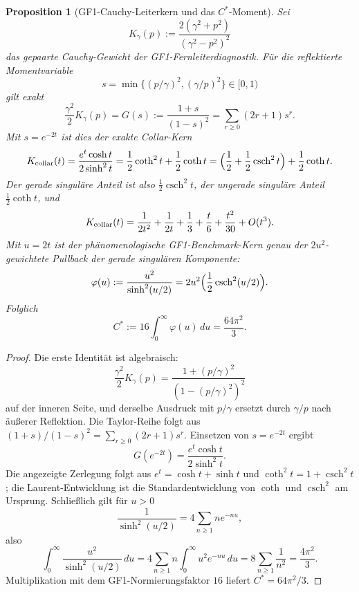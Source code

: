 \documentclass[11pt,a4paper]{article}
\newtheorem{proposition}[proposition]{Proposition}
\theoremstyle{remark}
\theoremstyle{plain}
\begin{document}
\begin{proposition}[GF1-Cauchy-Leiterkern und das \(C^*\)-Moment]
\label{prop:gf1-collar-kernel-cstar}
Sei
\[
  K_\gamma(p):=\frac{2(\gamma^2+p^2)}{(\gamma^2-p^2)^2}
\]
das gepaarte Cauchy-Gewicht der GF1-Fernleiterdiagnostik. Für die
reflektierte Momentvariable
\[
  s=\min\{(p/\gamma)^2,(\gamma/p)^2\}\in[0,1)
\]
gilt exakt
\[
  \frac{\gamma^2}{2}K_\gamma(p)
  =G(s):=\frac{1+s}{(1-s)^2}
  =\sum_{r\ge0}(2r+1)s^r.
\]
Mit \(s=e^{-2t}\) ist dies der exakte Collar-Kern
\[
  K_{\rm collar}(t)
  =\frac{e^t\cosh t}{2\sinh^2t}
  =\frac12\coth^2t+\frac12\coth t
  =\Bigl(\frac12+\frac12\operatorname{csch}^2t\Bigr)
    +\frac12\coth t .
\]
Der gerade singuläre Anteil ist also
\(\frac12\operatorname{csch}^2t\), der ungerade singuläre Anteil
\(\frac12\coth t\), und
\[
  K_{\rm collar}(t)
  =\frac{1}{2t^2}+\frac{1}{2t}+\frac13+\frac{t}{6}
    +\frac{t^2}{30}+O(t^3).
\]
Mit \(u=2t\) ist der phänomenologische GF1-Benchmark-Kern genau der
\(2u^2\)-gewichtete Pullback der gerade singulären Komponente:
\[
  \varphi(u):=\frac{u^2}{\sinh^2(u/2)}
  =2u^2\Bigl(\frac12\operatorname{csch}^2(u/2)\Bigr).
\]
Folglich
\[
  C^*:=16\int_0^\infty \varphi(u)\,du
  =\frac{64\pi^2}{3}.
\]
\end{proposition}

\begin{proof}
Die erste Identität ist algebraisch:
\[
  \frac{\gamma^2}{2}K_\gamma(p)
  =\frac{1+(p/\gamma)^2}{(1-(p/\gamma)^2)^2}
\]
auf der inneren Seite, und derselbe Ausdruck mit \(p/\gamma\) ersetzt
durch \(\gamma/p\) nach äußerer Reflektion. Die Taylor-Reihe folgt aus
\((1+s)/(1-s)^2=\sum_{r\ge0}(2r+1)s^r\). Einsetzen von \(s=e^{-2t}\)
ergibt
\[
  G(e^{-2t})=\frac{e^t\cosh t}{2\sinh^2t}.
\]
Die angezeigte Zerlegung folgt aus \(e^t=\cosh t+\sinh t\) und
\(\coth^2t=1+\operatorname{csch}^2t\); die Laurent-Entwicklung ist die
Standardentwicklung von \(\coth\) und \(\operatorname{csch}^2\) am
Ursprung. Schließlich gilt für \(u>0\)
\[
  \frac{1}{\sinh^2(u/2)}
  =4\sum_{n\ge1}n e^{-nu},
\]
also
\[
  \int_0^\infty \frac{u^2}{\sinh^2(u/2)}\,du
  =4\sum_{n\ge1}n\int_0^\infty u^2e^{-nu}\,du
  =8\sum_{n\ge1}\frac1{n^2}
  =\frac{4\pi^2}{3}.
\]
Multiplikation mit dem GF1-Normierungsfaktor \(16\) liefert
\(C^*=64\pi^2/3\).
\end{proof}
\end{document}
